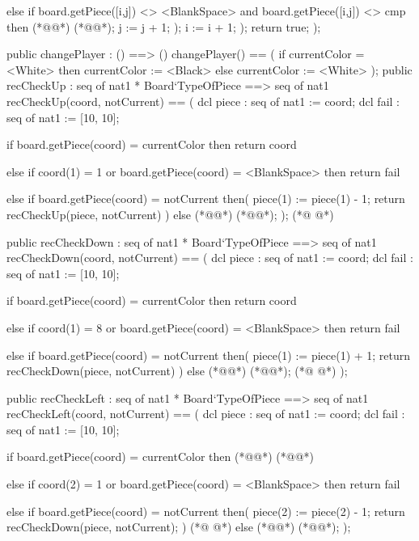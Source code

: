 \begin{vdmpp}[breaklines=true]
   else if board.getPiece([i,j]) <> <BlankSpace> and board.getPiece([i,j]) <> cmp
   then 
   (*@@*) (*@@*);
   j := j + 1;
  );
  i := i + 1;
  );
  return true;
 );
 
 
 public changePlayer : () ==> ()
 changePlayer() ==
 (
  if currentColor = <White>
   then currentColor := <Black>
   else currentColor := <White>
 );
 public recCheckUp : seq of nat1 * Board`TypeOfPiece ==> seq of nat1
 recCheckUp(coord, notCurrent) ==
 ( 
  dcl piece : seq of nat1 := coord;
  dcl fail : seq of nat1 := [10, 10];
   
  if board.getPiece(coord) = currentColor
  then return coord
    
  else if coord(1) = 1 or board.getPiece(coord) = <BlankSpace>
  then return fail
  
  else if board.getPiece(coord) = notCurrent
  then(
   piece(1) := piece(1) - 1;
   return recCheckUp(piece, notCurrent)
  ) 
  else (*@@*) (*@@*);
 );
(*@
\label{recCheckUp:122}
@*)
 
 public recCheckDown : seq of nat1 * Board`TypeOfPiece ==> seq of nat1
 recCheckDown(coord, notCurrent) ==
 ( 
  dcl piece : seq of nat1 := coord;
  dcl fail : seq of nat1 := [10, 10];
   
  if board.getPiece(coord) = currentColor
  then return coord
  
  else if coord(1) = 8 or board.getPiece(coord) = <BlankSpace>
  then return fail
  
  else if board.getPiece(coord) = notCurrent
  then(
   piece(1) := piece(1) + 1;
   return recCheckDown(piece, notCurrent)
  ) 
  else (*@@*) (*@@*);
(*@
\label{recCheckDown:141}
@*)
 );
 
 public recCheckLeft : seq of nat1 * Board`TypeOfPiece ==> seq of nat1
 recCheckLeft(coord, notCurrent) ==
 ( 
  dcl piece : seq of nat1 := coord;
  dcl fail : seq of nat1 := [10, 10];
   
  if board.getPiece(coord) = currentColor
  then (*@@*) (*@@*)
  
  else if coord(2) = 1 or board.getPiece(coord) = <BlankSpace>
  then return fail
  
  else if board.getPiece(coord) = notCurrent
  then(
   piece(2) := piece(2) - 1;
   return recCheckDown(piece, notCurrent);
  ) 
(*@
\label{recCheckLeft:160}
@*)
  else (*@@*) (*@@*);
 );
 

\end{vdmpp}
